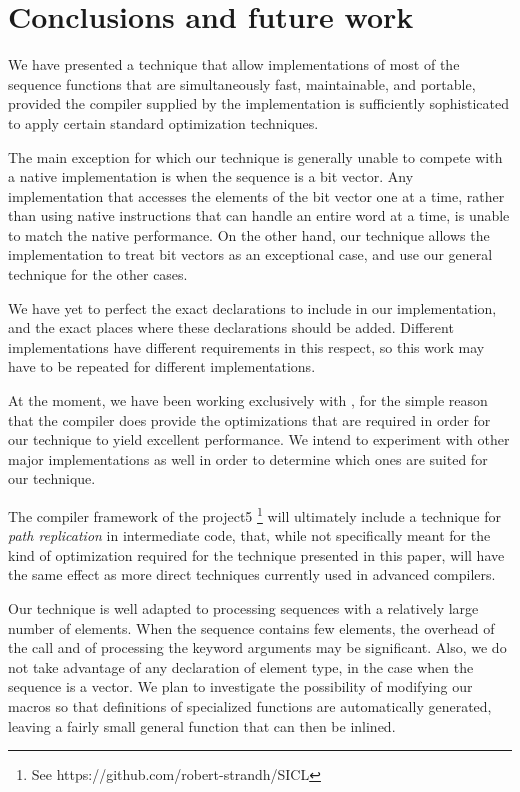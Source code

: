 \section{Conclusions and future work}

We have presented a technique that allow implementations of most of
the \commonlisp{} sequence functions that are simultaneously fast,
maintainable, and portable, provided the compiler supplied by the
implementation is sufficiently sophisticated to apply certain standard
optimization techniques.

The main exception for which our technique is generally unable to
compete with a native implementation is when the sequence is a bit
vector.  Any implementation that accesses the elements of the bit
vector one at a time, rather than using native instructions that can
handle an entire word at a time, is unable to match the native
performance.  On the other hand, our technique allows the
\commonlisp{} implementation to treat bit vectors as an exceptional
case, and use our general technique for the other cases.

We have yet to perfect the exact declarations to include in our
implementation, and the exact places where these declarations should
be added.  Different \commonlisp{} implementations have different
requirements in this respect, so this work may have to be repeated for
different implementations.

At the moment, we have been working exclusively with \sbcl{}, for the
simple reason that the \sbcl{} compiler does provide the optimizations
that are required in order for our technique to yield excellent
performance.  We intend to experiment with other major implementations
as well in order to determine which ones are suited for our
technique.

The \cleavir{} compiler framework of the \sicl{} project5
\footnote{See https://github.com/robert-strandh/SICL} will ultimately
include a technique for \emph{path replication} in intermediate code,
that, while not specifically meant for the kind of optimization
required for the technique presented in this paper, will have the same
effect as more direct techniques currently used in advanced
compilers.

Our technique is well adapted to processing sequences with a
relatively large number of elements.  When the sequence contains few
elements, the overhead of the call and of processing the keyword
arguments may be significant.  Also, we do not take advantage of any
declaration of element type, in the case when the sequence is a
vector.  We plan to investigate the possibility of modifying our
macros so that definitions of specialized functions are automatically
generated, leaving a fairly small general function that can then be
inlined.
